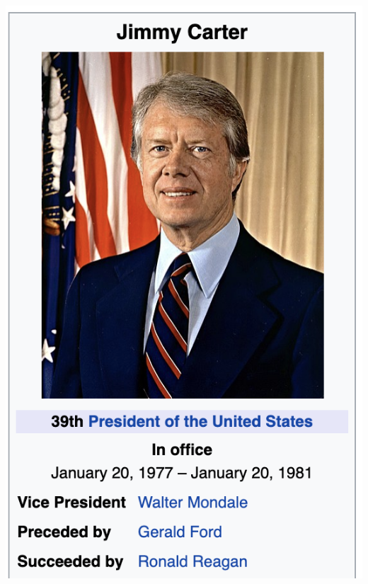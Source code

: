 \documentclass[landscape]{jhuslides3C}
\begin{document}
\vspace{-2cm}
\begin{flushright}
\includegraphics[scale=0.65]{jimmy-carter1.png}\\

\end{flushright}
\end{document}
